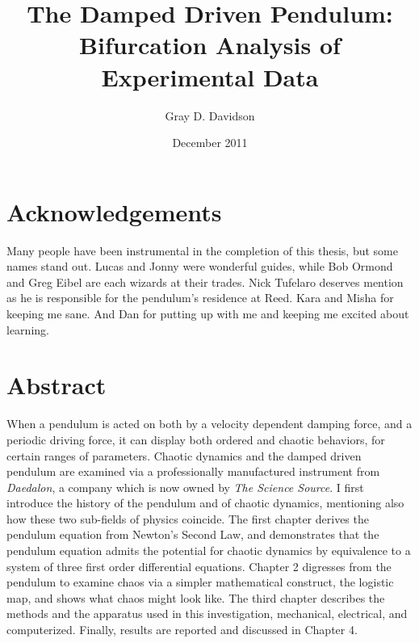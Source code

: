\documentclass[12pt,twoside]{reedthesis}
\title{The Damped Driven Pendulum: Bifurcation Analysis of Experimental Data}
\author{Gray D. Davidson}
\date{December 2011}
\begin{document}
  \maketitle
  \frontmatter %
  \pagestyle{empty} %


    \chapter*{Acknowledgements}

Many people have been instrumental in the completion of this thesis, but some names stand out.  Lucas and Jonny were wonderful guides, while Bob Ormond and Greg Eibel are each wizards at their trades.  Nick Tufelaro deserves mention as he is responsible for the pendulum's residence at Reed.  Kara and Misha for keeping me sane.  And Dan for putting up with me and keeping me excited about learning.  


    \tableofcontents
    \listoffigures

    \chapter*{Abstract}

When a pendulum is acted on both by a velocity dependent damping force, and a periodic driving force, it can display both ordered and chaotic behaviors, for certain ranges of parameters.  Chaotic dynamics and the damped driven pendulum are examined via a professionally manufactured instrument from \textit{Daedalon}, a company which is now owned by \textit{The Science Source}.  I first introduce the history of the pendulum and of chaotic dynamics, mentioning also how these two sub-fields of physics coincide.  The first chapter derives the pendulum equation from Newton's Second Law, and demonstrates that the pendulum equation admits the potential for chaotic dynamics by equivalence to a system of three first order differential equations.  Chapter 2 digresses from the pendulum to examine chaos via a simpler mathematical construct, the logistic map, and shows what chaos might look like.  The third chapter describes the methods and the apparatus used in this investigation, mechanical, electrical, and computerized.  Finally, results are reported and discussed in Chapter 4.  
\end{document}

